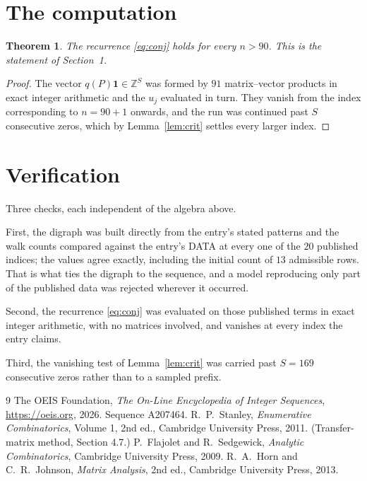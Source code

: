 \documentclass[11pt,a4paper]{article}
\theoremstyle{plain}
\newtheorem{theorem}{Theorem}
\theoremstyle{definition}
\begin{document}
\section{The computation}

\begin{theorem}
The recurrence \eqref{eq:conj} holds for every $n>90$. This is the statement of
Section~1.
\end{theorem}

\begin{proof}
The vector $q(P)\mathbf{1}\in\mathbb{Z}^{S}$ was formed by $91$ matrix--vector
products in exact integer arithmetic and the $u_j$ evaluated in turn. They vanish from the
index corresponding to $n=90+1$ onwards, and the run was continued past $S$ consecutive
zeros, which by Lemma~\ref{lem:crit} settles every larger index.
\end{proof}

\section{Verification}

Three checks, each independent of the algebra above.

First, the digraph was built directly from the entry's stated patterns and the walk counts
compared against the entry's DATA at every one of the $20$ published indices; the
values agree exactly, including the initial count of $13$ admissible rows. That is
what ties the digraph to the sequence, and a model reproducing only part of the published
data was rejected wherever it occurred.

Second, the recurrence \eqref{eq:conj} was evaluated on those published terms in exact
integer arithmetic, with no matrices involved, and vanishes at every index the entry claims.

Third, the vanishing test of Lemma~\ref{lem:crit} was carried past $S=169$ consecutive
zeros rather than to a sampled prefix.

\begin{thebibliography}{9}
 The OEIS Foundation, \emph{The On-Line Encyclopedia of Integer
Sequences}, \url{https://oeis.org}, 2026. Sequence A207464.
 R.~P.~Stanley, \emph{Enumerative Combinatorics}, Volume 1, 2nd ed.,
Cambridge University Press, 2011. (Transfer-matrix method, Section 4.7.)
 P.~Flajolet and R.~Sedgewick, \emph{Analytic Combinatorics}, Cambridge
University Press, 2009.
 R.~A.~Horn and C.~R.~Johnson, \emph{Matrix Analysis}, 2nd ed., Cambridge
University Press, 2013.
\end{thebibliography}
\end{document}
